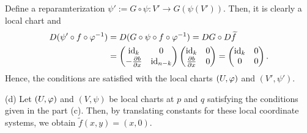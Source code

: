 \documentclass{../../large}
\begin{document}
\begin{pf}
Define a reparamterization $\psi':=G\circ\psi:V'\to G(\psi(V'))$.
Then, it is clearly a local chart and
\begin{align*}
D(\psi'\circ f\circ\f^{-1})
&=D(G\circ\psi\circ f\circ\f^{-1})
=DG\circ D\tilde f\\
&=\mat{\id_k&0\\-\pd{b}{x}&\id_{n-k}}\mat{\id_k&0\\\pd{b}{x}&0}
=\mat{\id_k&0\\0&0}.
\end{align*}
Hence, the conditions are satisfied with the local charts $(U,\varphi)$ and $(V',\psi')$.

(d)
Let $(U,\varphi)$ and $(V,\psi)$ be local charts at $p$ and $q$ satisfying the conditions given in the part (c).
Then, by translating constants for these local coordinate systems, we obtain $\tilde f(x,y)=(x,0)$.
\end{pf}
\end{document}
